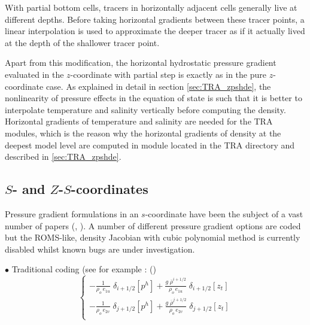 \documentclass[../main/NEMO_manual]{subfiles}
\begin{document}
With partial bottom cells, tracers in horizontally adjacent cells generally live at different depths.
Before taking horizontal gradients between these tracer points,
a linear interpolation is used to approximate the deeper tracer as if
it actually lived at the depth of the shallower tracer point.

Apart from this modification,
the horizontal hydrostatic pressure gradient evaluated in the $z$-coordinate with partial step is exactly as in
the pure $z$-coordinate case.
As explained in detail in section \autoref{sec:TRA_zpshde},
the nonlinearity of pressure effects in the equation of state is such that
it is better to interpolate temperature and salinity vertically before computing the density.
Horizontal gradients of temperature and salinity are needed for the TRA modules,
which is the reason why the horizontal gradients of density at the deepest model level are computed in
module  located in the TRA directory and described in \autoref{sec:TRA_zpshde}.

\subsection{$S$- and $Z$-$S$-coordinates}
\label{subsec:DYN_hpg_sco}

Pressure gradient formulations in an $s$-coordinate have been the subject of a vast number of papers
(\eg, \citet{song_MWR98, shchepetkin.mcwilliams_OM05}).
A number of different pressure gradient options are coded but the ROMS-like,
density Jacobian with cubic polynomial method is currently disabled whilst known bugs are under investigation.

$\bullet$ Traditional coding (see for example \citet{madec.delecluse.ea_JPO96}: ()
\begin{equation}
  \label{eq:DYN_hpg_sco}
  \left\{
    \begin{aligned}
      - \frac{1}    					{\rho_o \, e_{1u}} \;	\delta_{i+1/2} \left[  p^h  \right]
      + \frac{g\; \overline {\rho}^{i+1/2}}	{\rho_o \, e_{1u}} \;	\delta_{i+1/2} \left[  z_t   \right]    \\
      - \frac{1}    					{\rho_o \, e_{2v}} \;	\delta_{j+1/2} \left[  p^h  \right]
      + \frac{g\; \overline {\rho}^{j+1/2}}	{\rho_o \, e_{2v}} \;	\delta_{j+1/2} \left[  z_t   \right]    \\
    \end{aligned}
  \right.
\end{equation}
\end{document}
